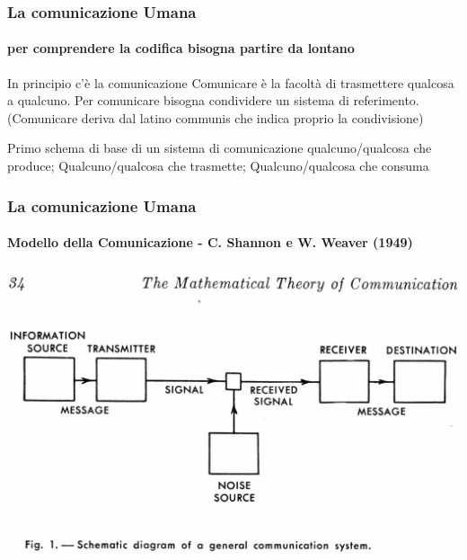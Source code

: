 \begin{frame}
	\frametitle{La comunicazione Umana}
	\framesubtitle{per comprendere la codifica bisogna partire da lontano}
	\addtocounter{nframe}{1}

	\begin{block}{In principio c'è la comunicazione}
		Comunicare è la facoltà di trasmettere qualcosa a qualcuno. Per comunicare bisogna condividere un sistema di referimento.
		\\(Comunicare deriva dal latino communis che indica proprio la condivisione)
	\end{block}

	\begin{block}{Primo schema di base di un sistema di comunicazione}
		qualcuno/qualcosa che produce; Qualcuno/qualcosa che trasmette; Qualcuno/qualcosa che consuma
	\end{block}

\end{frame}

\begin{frame}
	\frametitle{La comunicazione Umana}
	\framesubtitle{Modello della Comunicazione - C. Shannon e W. Weaver (1949)}
	\addtocounter{nframe}{1}

	\begin{center}
		\includegraphics[width=.9\textwidth]{imgs/shannon_comm_channel.jpg}
	\end{center}

\end{frame}

